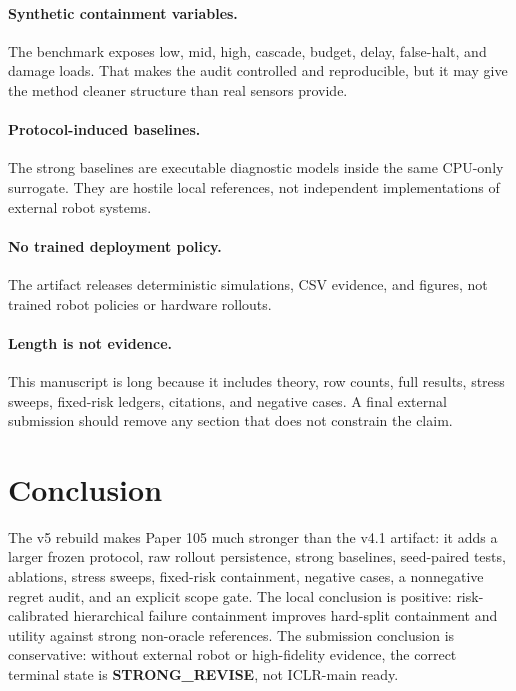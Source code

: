 \documentclass{article}
\begin{document}
\paragraph{Synthetic containment variables.}
The benchmark exposes low, mid, high, cascade, budget, delay, false-halt, and damage loads. That makes the audit controlled and reproducible, but it may give the method cleaner structure than real sensors provide.

\paragraph{Protocol-induced baselines.}
The strong baselines are executable diagnostic models inside the same CPU-only surrogate. They are hostile local references, not independent implementations of external robot systems.

\paragraph{No trained deployment policy.}
The artifact releases deterministic simulations, CSV evidence, and figures, not trained robot policies or hardware rollouts.

\paragraph{Length is not evidence.}
This manuscript is long because it includes theory, row counts, full results, stress sweeps, fixed-risk ledgers, citations, and negative cases. A final external submission should remove any section that does not constrain the claim.

\section{Conclusion}
The v5 rebuild makes Paper 105 much stronger than the v4.1 artifact: it adds a larger frozen protocol, raw rollout persistence, strong baselines, seed-paired tests, ablations, stress sweeps, fixed-risk containment, negative cases, a nonnegative regret audit, and an explicit scope gate. The local conclusion is positive: risk-calibrated hierarchical failure containment improves hard-split containment and utility against strong non-oracle references. The submission conclusion is conservative: without external robot or high-fidelity evidence, the correct terminal state is \textbf{STRONG\_REVISE}, not ICLR-main ready.

\clearpage
\appendix
\end{document}
